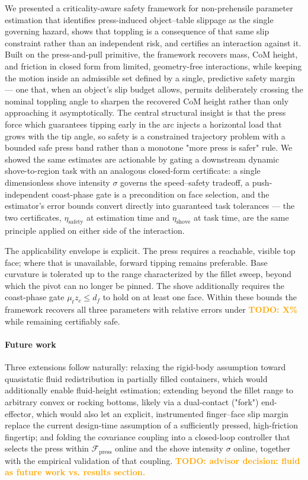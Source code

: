 \documentclass[10pt, conference]{IEEEtran}
\newcommand{\todo}[1]{\textcolor{orange}{\textbf{TODO: #1}}}
\begin{document}
We presented a criticality-aware safety framework for non-prehensile parameter estimation that identifies press-induced object--table slippage as the single governing hazard, shows that toppling is a consequence of that same slip constraint rather than an independent risk, and certifies an interaction against it. Built on the press-and-pull primitive, the framework recovers mass, CoM height, and friction in closed form from limited, geometry-free interactions, while keeping the motion inside an admissible set defined by a single, predictive safety margin --- one that, when an object's slip budget allows, permits deliberately crossing the nominal toppling angle to sharpen the recovered CoM height rather than only approaching it asymptotically. The central structural insight is that the press force which guarantees tipping early in the arc injects a horizontal load that grows with the tip angle, so safety is a constrained trajectory problem with a bounded safe press band rather than a monotone "more press is safer" rule. We showed the same estimates are actionable by gating a downstream dynamic shove-to-region task with an analogous closed-form certificate: a single dimensionless shove intensity $\sigma$ governs the speed--safety tradeoff, a push-independent coast-phase gate is a precondition on face selection, and the estimator's error bounds convert directly into guaranteed task tolerances --- the two certificates, $\eta_{\mathrm{safety}}$ at estimation time and $\eta_{\mathrm{shove}}$ at task time, are the same principle applied on either side of the interaction.

The applicability envelope is explicit. The press requires a reachable, visible top face; where that is unavailable, forward tipping remains preferable. Base curvature is tolerated up to the range characterized by the fillet sweep, beyond which the pivot can no longer be pinned. The shove additionally requires the coast-phase gate $\mu_t z_c \le d_f$ to hold on at least one face. Within these bounds the framework recovers all three parameters with relative errors under \todo{X\%} while remaining certifiably safe.

\paragraph{Future work} Three extensions follow naturally: relaxing the rigid-body assumption toward quasistatic fluid redistribution in partially filled containers, which would additionally enable fluid-height estimation; extending beyond the fillet range to arbitrary convex or rocking bottoms, likely via a dual-contact ("fork") end-effector, which would also let an explicit, instrumented finger--face slip margin replace the current design-time assumption of a sufficiently pressed, high-friction fingertip; and folding the covariance coupling into a closed-loop controller that selects the press within $\mathcal{F}_{\mathrm{press}}$ online and the shove intensity $\sigma$ online, together with the empirical validation of that coupling. \todo{advisor decision: fluid as future work vs. results section.}

\ifCLASSOPTIONcaptionsoff
  \newpage
\fi


\end{document}
